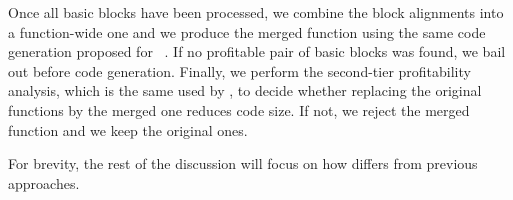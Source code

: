 Once all basic blocks have been processed, we combine the block alignments into a function-wide one and we produce the merged function using the same code generation proposed for {\SOAName}~\cite{rocha20}.
If no profitable pair of basic blocks was found, we bail out before code generation.
Finally, we perform the second-tier profitability analysis, which is the same used by {\SOAName}, to decide whether replacing the original functions by the merged one reduces code size. If not, we reject the merged function and we keep the original ones.

For brevity, the rest of the discussion will focus on how {\ProjName} differs from previous approaches. 





